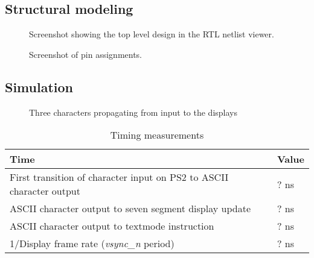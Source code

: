 \documentclass[12pt,a4paper,titlepage,oneside]{article}
\begin{document}
\maketitle

\subsection*{Structural modeling}
\begin{figure}[ht!]
  \centering
  \caption{Screenshot showing the top level design in the RTL netlist viewer.}
\end{figure}

\begin{figure}[ht!]
  \centering
  \caption{Screenshot of pin assignments.}
\end{figure}

\subsection*{Simulation}

\begin{figure}[ht!]
  \centering
  \caption{Three characters propagating from input to the displays}
\end{figure}

\begin{table}[ht!]
  \centering
  \caption{Timing measurements}
  \begin{tabular}{|l|l|}
    \hline
    Time                                                                 & Value  \\ \hline 
    First transition of character input on PS2 to ASCII character output & ? ns   \\
    ASCII character output to seven segment display update               & ? ns   \\
    ASCII character output to textmode instruction                       & ? ns   \\
    1/Display frame rate (\emph{vsync\_n} period)                        & ? ns   \\ \hline
  \end{tabular}
\end{table}
\end{document}
